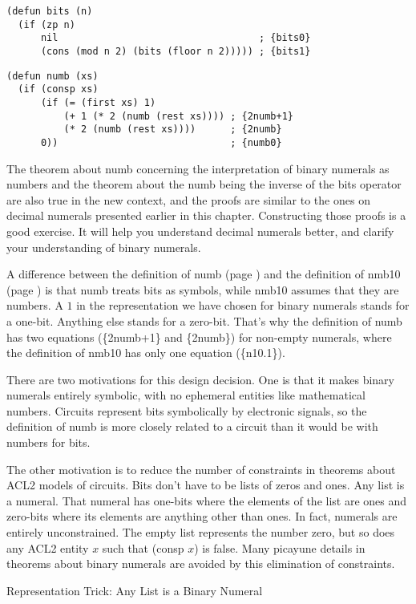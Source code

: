 \label{bits-defun}
\begin{Verbatim}
(defun bits (n)
  (if (zp n)
      nil                                   ; {bits0}
      (cons (mod n 2) (bits (floor n 2))))) ; {bits1}
\end{Verbatim}
\label{nmb-defun}
\begin{Verbatim}
(defun numb (xs)
  (if (consp xs)
      (if (= (first xs) 1)
          (+ 1 (* 2 (numb (rest xs)))) ; {2numb+1}
          (* 2 (numb (rest xs))))      ; {2numb}
      0))                              ; {numb0}
\end{Verbatim}

The theorem about numb concerning the interpretation of
binary numerals as numbers and the theorem about the numb
being the inverse of the bits operator are
also true in the new context, and the proofs are similar to the ones
on decimal numerals presented earlier in this chapter.
Constructing those proofs is a good exercise.
It will help you understand decimal numerals better,
and clarify your understanding of binary numerals.

\begin{aside}
A difference between the definition of numb (page \pageref{nmb-defun})
and the definition of nmb10 (page \pageref{nmb10-defun})
is that numb treats bits as symbols,
while nmb10 assumes that they are numbers.
A $1$ in the representation we have chosen for binary numerals
stands for a one-bit. Anything else stands for a zero-bit.
That's why the definition of numb has two equations (\{2numb+1\} and \{2numb\})
for non-empty numerals,
where the definition of nmb10 has only one equation (\{n10.1\}).

There are two motivations for this design decision.
One is that it makes binary numerals entirely symbolic,
with no ephemeral entities like mathematical numbers.
Circuits represent bits symbolically by electronic signals,
so the definition of numb is more closely
related to a circuit than it would be with numbers for bits.

The other motivation is to reduce the number of constraints
in theorems about ACL2 models of circuits.
Bits don't have to be lists of zeros and ones.
Any list is a numeral.
That numeral has one-bits where the elements of the list are ones
and zero-bits where its elements are anything other than ones.
In fact, numerals are entirely unconstrained.
The empty list represents the number zero,
but so does any ACL2 entity $x$ such that (consp $x$) is false.
Many picayune details in theorems about binary numerals
are avoided by this elimination of constraints.
\caption{Representation Trick: Any List is a Binary Numeral}
\label{aside:numeral-representation-trick}
\end{aside}

